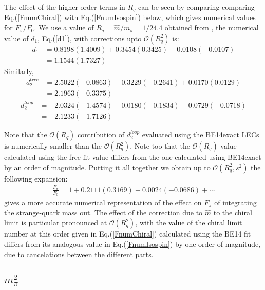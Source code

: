 \documentclass[12pt,a4paper]{article}
\begin{document}
The effect of the higher order terms in $R_q$ can be seen by comparing comparing Eq.(\ref{FnumChiral}) with Eq.(\ref{FnumIsospin}) below, which gives numerical values for $F_\pi/F_0$. We use a value of $R_q = \hat{m}/m_s = 1/24.4$ obtained from \cite{Leutwyler:1996qg}, the numerical value of $d_1$, Eq.(\ref{d1}), with corrections upto $\mathcal{O}(R_q^2)$ is:
\begin{align}
	d_1 &= 0.8198 (1.4009) + 0.3454 (0.3425) - 0.0108 (-0.0107) \nonumber \\
		& = 1.1544 (1.7327)
\end{align}
Similarly,
\begin{align}
	d_2^{tree} &= 2.5022 (-0.0863) - 0.3229 (-0.2641) + 0.0170 (0.0129) \nonumber \\
	& = 2.1963 (-0.3375)
\end{align}
\begin{align}
	d_2^{loop} &= -2.0324 (-1.4574) - 0.0180 (-0.1834) - 0.0729 (-0.0718) \nonumber \\
	& = -2.1233 (-1.7126)
\end{align}

Note that the $\mathcal{O}(R_q)$ contribution of $d_2^{loop}$ evaluated using the BE14exact LECs is numerically smaller than the $\mathcal{O}(R_q^2)$. Note too that the $\mathcal{O}(R_q)$ value calculated using the free fit value differs from the one calculated using BE14exact by an order of magnitude. Putting it all together we obtain up to $\mathcal{O}(R_q^2,s^2)$ the following expansion:
\begin{align}
	\frac{F_{\pi}}{F_0} = 1 + 0.2111 (0.3169) + 0.0024 (-0.0686) + \cdots \label{FnumIsospin}
\end{align}
gives a more accurate numerical representation of the effect on $F_\pi$ of integrating the strange-quark mass out. The effect of the correction due to $\hat m$ to the chiral limit is particular pronounced at $\mathcal{O}(R_q^2)$, with the value of the chiral limit number at this order given in Eq.(\ref{FnumChiral}) calculated using the BE14 fit differs from its analogous value in Eq.(\ref{FnumIsospin}) by one order of magnitude, due to cancelations between the different parts.


\subsection{$m_\pi^2$}
\end{document}
